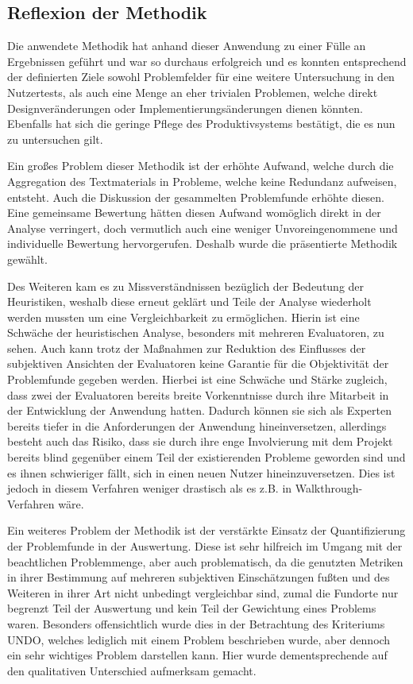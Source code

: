 \documentclass[
  12pt,
  ngerman,
  a4paper,
]{article}
\begin{document}
\hypertarget{reflexion-der-methodik}{%
\subsection{Reflexion der Methodik}\label{reflexion-der-methodik}}

Die anwendete Methodik hat anhand dieser Anwendung zu einer Fülle an
Ergebnissen geführt und war so durchaus erfolgreich und es konnten
entsprechend der definierten Ziele sowohl Problemfelder für eine weitere
Untersuchung in den Nutzertests, als auch eine Menge an eher trivialen
Problemen, welche direkt Designveränderungen oder
Implementierungsänderungen dienen könnten. Ebenfalls hat sich die
geringe Pflege des Produktivsystems bestätigt, die es nun zu untersuchen
gilt.

Ein großes Problem dieser Methodik ist der erhöhte Aufwand, welche durch
die Aggregation des Textmaterials in Probleme, welche keine Redundanz
aufweisen, entsteht. Auch die Diskussion der gesammelten Problemfunde
erhöhte diesen. Eine gemeinsame Bewertung hätten diesen Aufwand
womöglich direkt in der Analyse verringert, doch vermutlich auch eine
weniger Unvoreingenommene und individuelle Bewertung hervorgerufen.
Deshalb wurde die präsentierte Methodik gewählt.

Des Weiteren kam es zu Missverständnissen bezüglich der Bedeutung der
Heuristiken, weshalb diese erneut geklärt und Teile der Analyse
wiederholt werden mussten um eine Vergleichbarkeit zu ermöglichen.
Hierin ist eine Schwäche der heuristischen Analyse, besonders mit
mehreren Evaluatoren, zu sehen. Auch kann trotz der Maßnahmen zur
Reduktion des Einflusses der subjektiven Ansichten der Evaluatoren keine
Garantie für die Objektivität der Problemfunde gegeben werden. Hierbei
ist eine Schwäche und Stärke zugleich, dass zwei der Evaluatoren bereits
breite Vorkenntnisse durch ihre Mitarbeit in der Entwicklung der
Anwendung hatten. Dadurch können sie sich als Experten bereits tiefer in
die Anforderungen der Anwendung hineinversetzen, allerdings besteht auch
das Risiko, dass sie durch ihre enge Involvierung mit dem Projekt
bereits blind gegenüber einem Teil der existierenden Probleme geworden
sind und es ihnen schwieriger fällt, sich in einen neuen Nutzer
hineinzuversetzen. Dies ist jedoch in diesem Verfahren weniger drastisch
als es z.B. in Walkthrough-Verfahren wäre.

Ein weiteres Problem der Methodik ist der verstärkte Einsatz der
Quantifizierung der Problemfunde in der Auswertung. Diese ist sehr
hilfreich im Umgang mit der beachtlichen Problemmenge, aber auch
problematisch, da die genutzten Metriken in ihrer Bestimmung auf
mehreren subjektiven Einschätzungen fußten und des Weiteren in ihrer Art
nicht unbedingt vergleichbar sind, zumal die Fundorte nur begrenzt Teil
der Auswertung und kein Teil der Gewichtung eines Problems waren.
Besonders offensichtlich wurde dies in der Betrachtung des Kriteriums
UNDO, welches lediglich mit einem Problem beschrieben wurde, aber
dennoch ein sehr wichtiges Problem darstellen kann. Hier wurde
dementsprechende auf den qualitativen Unterschied aufmerksam gemacht.
\end{document}
